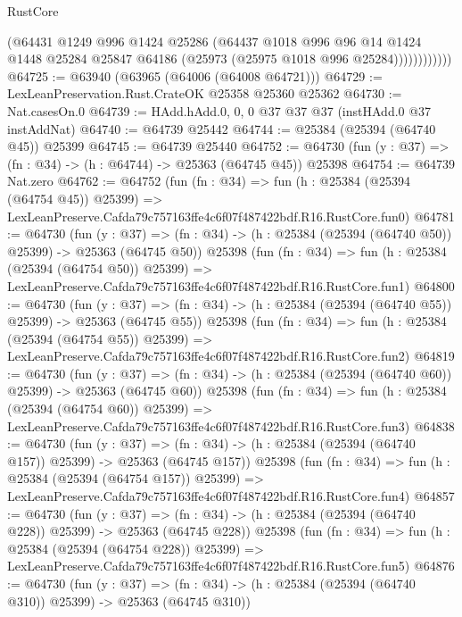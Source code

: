 \begin{lexlean}{RustCore}
\begin{coremodule}
                    (@64431
                      @1249
                      @996
                      @1424
                      @25286
                      (@64437
                        @1018
                        @996
                        @96
                        @14
                        @1424
                        @1448
                        @25284
                        @25847
                        @64186
                        (@25973 (@25975 @1018 @996 @25284))))))))))))
@64725 := @63940 (@63965 (@64006 (@64008 @64721)))
@64729 := LexLeanPreservation.Rust.CrateOK @25358 @25360 @25362
@64730 := Nat.casesOn.{0}
@64739 := HAdd.hAdd.{0, 0, 0} @37 @37 @37 (instHAdd.{0} @37 instAddNat)
@64740 := @64739 @25442
@64744 := @25384 (@25394 (@64740 @45)) @25399
@64745 := @64739 @25440
@64752 := @64730 (fun (y : @37) => (fn : @34) -> (h : @64744) -> @25363 (@64745 @45)) @25398
@64754 := @64739 Nat.zero
@64762 := @64752
    (fun (fn : @34) =>
    fun (h : @25384 (@25394 (@64754 @45)) @25399) =>
    LexLeanPreserve.Cafda79c757163ffe4c6f07f487422bdf.R16.RustCore.fun0)
@64781 := @64730
    (fun (y : @37) =>
    (fn : @34) -> (h : @25384 (@25394 (@64740 @50)) @25399) -> @25363 (@64745 @50))
    @25398
    (fun (fn : @34) =>
    fun (h : @25384 (@25394 (@64754 @50)) @25399) =>
    LexLeanPreserve.Cafda79c757163ffe4c6f07f487422bdf.R16.RustCore.fun1)
@64800 := @64730
    (fun (y : @37) =>
    (fn : @34) -> (h : @25384 (@25394 (@64740 @55)) @25399) -> @25363 (@64745 @55))
    @25398
    (fun (fn : @34) =>
    fun (h : @25384 (@25394 (@64754 @55)) @25399) =>
    LexLeanPreserve.Cafda79c757163ffe4c6f07f487422bdf.R16.RustCore.fun2)
@64819 := @64730
    (fun (y : @37) =>
    (fn : @34) -> (h : @25384 (@25394 (@64740 @60)) @25399) -> @25363 (@64745 @60))
    @25398
    (fun (fn : @34) =>
    fun (h : @25384 (@25394 (@64754 @60)) @25399) =>
    LexLeanPreserve.Cafda79c757163ffe4c6f07f487422bdf.R16.RustCore.fun3)
@64838 := @64730
    (fun (y : @37) =>
    (fn : @34) -> (h : @25384 (@25394 (@64740 @157)) @25399) -> @25363 (@64745 @157))
    @25398
    (fun (fn : @34) =>
    fun (h : @25384 (@25394 (@64754 @157)) @25399) =>
    LexLeanPreserve.Cafda79c757163ffe4c6f07f487422bdf.R16.RustCore.fun4)
@64857 := @64730
    (fun (y : @37) =>
    (fn : @34) -> (h : @25384 (@25394 (@64740 @228)) @25399) -> @25363 (@64745 @228))
    @25398
    (fun (fn : @34) =>
    fun (h : @25384 (@25394 (@64754 @228)) @25399) =>
    LexLeanPreserve.Cafda79c757163ffe4c6f07f487422bdf.R16.RustCore.fun5)
@64876 := @64730
    (fun (y : @37) =>
    (fn : @34) -> (h : @25384 (@25394 (@64740 @310)) @25399) -> @25363 (@64745 @310))

\end{coremodule}
\end{lexlean}
